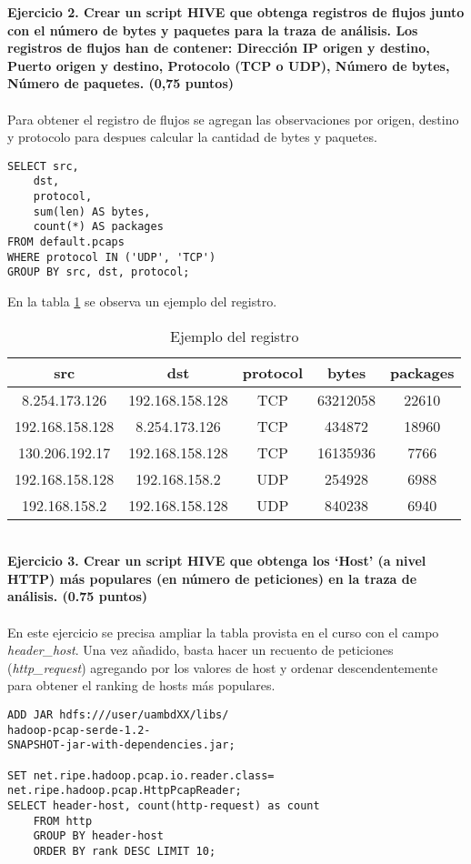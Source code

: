 \textbf{Ejercicio 2. Crear un script HIVE que obtenga registros de flujos junto con el número de bytes y paquetes
	para la traza de análisis. Los registros de flujos han de contener: Dirección IP origen y destino, Puerto origen y destino, Protocolo (TCP o UDP), Número de bytes, Número de paquetes. (0,75 puntos)}\\\\
Para obtener el registro de flujos se agregan las observaciones por origen, destino y protocolo para despues calcular la cantidad de bytes y paquetes. 
\begin{lstlisting}[caption=Consulta para obtener el registro de flujos]
SELECT src,
	dst, 
	protocol,
	sum(len) AS bytes,
	count(*) AS packages 
FROM default.pcaps
WHERE protocol IN ('UDP', 'TCP')
GROUP BY src, dst, protocol;
\end{lstlisting}
En la tabla \ref{tab:c2} se observa un ejemplo del registro.
\begin{table}[ht]
	\centering
	\caption{Ejemplo del registro}
	\begin{tabular}[t]{ccccc}
		src	& dst &	protocol &	bytes &	packages\\
		\hline
		8.254.173.126 & 192.168.158.128	& TCP &	63212058 &	22610 \\
			192.168.158.128 &	8.254.173.126 &	TCP &	434872 &	18960\\
			130.206.192.17 &	192.168.158.128 &	TCP  &	16135936 &	7766 \\
			192.168.158.128 &	192.168.158.2 &	UDP &	254928 &	6988\\
			192.168.158.2 &	192.168.158.128 &	UDP &	840238 &	6940
	\end{tabular}
	\label{tab:c2}
\end{table}%
\\
\textbf{Ejercicio 3. Crear un script HIVE que obtenga los ‘Host’ (a nivel HTTP) más populares (en número de
	peticiones) en la traza de análisis. (0.75 puntos)}\\\\
En este ejercicio se precisa ampliar la tabla provista en el curso con el campo \textit{header\_host}. Una vez añadido, basta hacer un recuento de peticiones (\textit{http\_request}) agregando por los valores de host y ordenar descendentemente para obtener el ranking de hosts más populares.
\begin{lstlisting}[caption=Consulta para obtener el ranking de hosts]
ADD JAR hdfs:///user/uambdXX/libs/
hadoop-pcap-serde-1.2-
SNAPSHOT-jar-with-dependencies.jar;

SET net.ripe.hadoop.pcap.io.reader.class=
net.ripe.hadoop.pcap.HttpPcapReader;
SELECT header-host, count(http-request) as count
	FROM http 
	GROUP BY header-host 
	ORDER BY rank DESC LIMIT 10;
\end{lstlisting}

